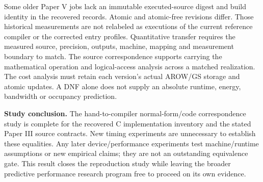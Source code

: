 Some older Paper V jobs lack an immutable executed-source digest and build
identity in the recovered records. Atomic and atomic-free revisions differ. Those historical
measurements are not relabeled as executions of the current reference compiler
or the corrected entry profiles. Quantitative transfer requires the measured
source, precision, outputs, machine, mapping and measurement boundary to match.
The source correspondence supports carrying the mathematical operation and
logical-access analysis across a matched realization. The cost analysis must
retain each version's actual AROW/GS storage and atomic updates. A DNF alone does not
supply an absolute runtime, energy, bandwidth or occupancy prediction.

\textbf{Study conclusion.} The hand-to-compiler normal-form/code correspondence
study is complete for the recovered C implementation inventory and the stated
Paper III source contracts. New timing experiments are unnecessary to establish
these equalities. Any later device/performance experiments test machine/runtime
assumptions or new empirical claims; they are not an outstanding equivalence gate.
This result closes the reproduction study while leaving the broader predictive
performance research program free to proceed on its own evidence.

